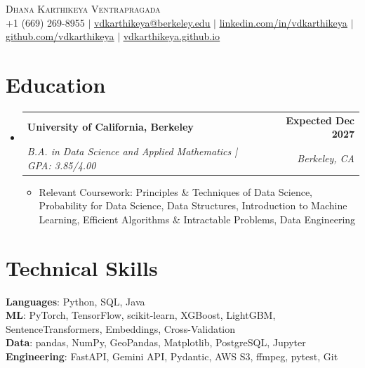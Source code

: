 \documentclass[letterpaper,11pt]{article}
\makeatletter
\newcommand{\resumeItem}[1]{%
  \item\small{{#1\vspace{-2pt}}}%
}
\newcommand{\resumeSubheading}[4]{
  \vspace{-2pt}\item
    \begin{tabular*}{1.0\textwidth}[t]{l@{\extracolsep{\fill}}r}
      \textbf{#1} & \textbf{\small #2} \\
      \textit{\small#3} & \textit{\small #4} \\
    \end{tabular*}\vspace{-7pt}
}
\newcommand{\resumeSubHeadingListStart}{\begin{itemize}[leftmargin=0.0in, label={}]}
\newcommand{\resumeSubHeadingListEnd}{\end{itemize}}
\newcommand{\resumeItemListStart}{\begin{itemize}[itemsep=2.5pt, topsep=3pt]}
\newcommand{\resumeItemListEnd}{\end{itemize}\vspace{-4pt}}
\makeatother
\begin{document}
\begin{center}
    {\Huge \scshape Dhana Karthikeya Ventrapragada} \\ \vspace{1pt}
        \footnotesize
    +1 (669) 269-8955 $|$
    \href{mailto:vdkarthikeya@berkeley.edu}{\uline{vdkarthikeya@berkeley.edu}} $|$
    \href{https://www.linkedin.com/in/vdkarthikeya/}{\uline{linkedin.com/in/vdkarthikeya}} $|$
    \href{https://github.com/vdkarthikeya}{\uline{github.com/vdkarthikeya}} $|$
    \href{https://vdkarthikeya.github.io}{\uline{vdkarthikeya.github.io}}
    \vspace{-8pt}
\end{center}

\section{Education}
\resumeSubHeadingListStart

\resumeSubheading
{University of California, Berkeley}{Expected Dec 2027}
{B.A. in Data Science and Applied Mathematics \;|\; GPA: 3.85/4.00}{Berkeley, CA}

\vspace{-6pt}
\resumeItemListStart
\resumeItem{Relevant Coursework: Principles \& Techniques of Data Science, Probability for Data Science, Data Structures, Introduction to Machine Learning, Efficient Algorithms \& Intractable Problems, Data Engineering}
\resumeItemListEnd

\resumeSubHeadingListEnd
\vspace{-14pt}

\section{Technical Skills}
 \begin{itemize}[leftmargin=0.15in, label={}, itemsep=3pt]
    \small{\item{
     \textbf{Languages}{: Python, SQL, Java} \\[2pt]
     \textbf{ML}{: PyTorch, TensorFlow, scikit-learn, XGBoost, LightGBM, SentenceTransformers, Embeddings, Cross-Validation} \\[2pt]
     \textbf{Data}{: pandas, NumPy, GeoPandas, Matplotlib, PostgreSQL, Jupyter} \\[2pt]
     \textbf{Engineering}{: FastAPI, Gemini API, Pydantic, AWS S3, ffmpeg, pytest, Git}
    }}
 \end{itemize}
 \vspace{-15pt}
\end{document}
